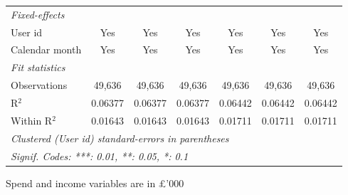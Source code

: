 \begin{table}[htbp]
\begin{threeparttable}[b]
\begin{tabular}{lcccccc}
         \midrule
         \emph{Fixed-effects}\\
         User id                 & Yes            & Yes            & Yes            & Yes             & Yes              & Yes\\  
         Calendar month          & Yes            & Yes            & Yes            & Yes             & Yes              & Yes\\  
         \midrule
         \emph{Fit statistics}\\
         Observations            & 49,636         & 49,636         & 49,636         & 49,636          & 49,636           & 49,636\\  
         R$^2$                   & 0.06377        & 0.06377        & 0.06377        & 0.06442         & 0.06442          & 0.06442\\  
         Within R$^2$            & 0.01643        & 0.01643        & 0.01643        & 0.01711         & 0.01711          & 0.01711\\  
         \midrule \midrule
         \multicolumn{7}{l}{\emph{Clustered (User id) standard-errors in parentheses}}\\
         \multicolumn{7}{l}{\emph{Signif. Codes: ***: 0.01, **: 0.05, *: 0.1}}\\
      \end{tabular}
      
      \begin{tablenotes}\footnotesize
         \item Spend and income variables are in £'000
      \end{tablenotes}
   \end{threeparttable}
\end{table}


